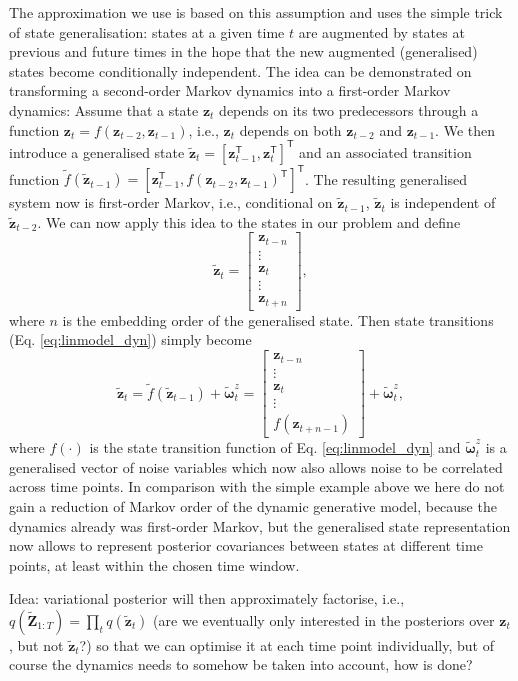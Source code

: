 \documentclass[a4paper,10pt]{article}
\newcommand{\bs}[1]{\mathbf{#1}}					%
\newcommand{\bgs}[1]{\boldsymbol{#1}}				%
\newcommand{\tr}{\mathsf{T}}				%
\newcommand{\eq}[1]{\begin{equation} #1 \end{equation}}%
\newcommand{\gc}[1]{\tilde{#1}} %
\renewcommand{\ss}{z}         %
\newcommand{\sn}{\omega} %
\newcommand{\ps}{\bs{\ss}}    %
\newcommand{\pn}{\bgs{\sn}} %
\newcommand{\psg}{\gc{\ps}}    %
\newcommand{\png}{\gc{\pn}}    %
\newcommand{\Ps}{\bs{Z}}    %
\newcommand{\Psg}{\gc{\Ps}}    %
\begin{document}
The approximation we use is based on this assumption and uses the simple trick of state generalisation: states at a given time $t$ are augmented by states at previous and future times in the hope that the new augmented (generalised) states become conditionally independent. The idea can be demonstrated on transforming a second-order Markov dynamics into a first-order Markov dynamics: Assume that a state $\ps_t$ depends on its two predecessors through a function $\ps_t = f(\ps_{t-2}, \ps_{t-1})$, i.e., $\ps_t$ depends on both $\ps_{t-2}$ and $\ps_{t-1}$. We then introduce a generalised state $\psg_t = [\ps_{t-1}^\tr, \ps_t^\tr]^\tr$ and an associated transition function $\gc{f}(\psg_{t-1}) = [\ps_{t-1}^\tr, f(\ps_{t-2}, \ps_{t-1})^\tr]^\tr$. The resulting generalised system now is first-order Markov, i.e., conditional on $\psg_{t-1}$, $\psg_t$ is independent of $\psg_{t-2}$. We can now apply this idea to the states in our problem and define
\eq{
    \psg_t = \left[ \begin{array}{c} \ps_{t-n}\\ \vdots\\ \ps_t\\ \vdots\\ \ps_{t+n}\end{array} \right],
}
where $n$ is the embedding order of the generalised state. Then state transitions (Eq. \ref{eq:linmodel_dyn}) simply become
\eq{
    \label{eq:discrete_generalised_dyn} \psg_t = \gc{f}(\psg_{t-1}) + \png_t^\ss = \left[ \begin{array}{c} \ps_{t-n}\\ \vdots\\ \ps_t\\ \vdots\\ f(\ps_{t+n-1})\end{array} \right] + \png_t^\ss,
}
where $f(\cdot)$ is the state transition function of Eq. \ref{eq:linmodel_dyn} and $\png_t^\ss$ is a generalised vector of noise variables which now also allows noise to be correlated across time points. In comparison with the simple example above we here do not gain a reduction of Markov order of the dynamic generative model, because the dynamics already was first-order Markov, but the generalised state representation now allows to represent posterior covariances between states at different time points, at least within the chosen time window.

Idea: variational posterior will then approximately factorise, i.e., $q(\Psg_{1:T}) = \prod_t q(\psg_t)$ (are we eventually only interested in the posteriors over $\ps_t$, but not $\psg_t$?) so that we can optimise it at each time point individually, but of course the dynamics needs to somehow be taken into account, how is done?
\end{document}
